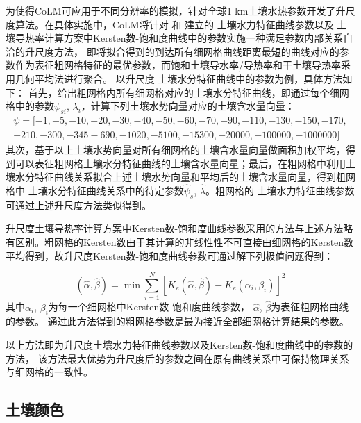 为使得CoLM可应用于不同分辨率的模拟，针对全球1 km土壤水热参数开发了升尺度算法。在具体实施中，CoLM将针对 \citet{campbell1974} 和 \citet{van1980closed} 建立的
土壤水力特征曲线参数以及 \citet{balland2005} 土壤导热率计算方案中Kersten数-饱和度曲线中的参数实施一种满足参数内部关系自洽的升尺度方法，
即将拟合得到的到达所有细网格曲线距离最短的曲线对应的参数作为表征粗网格特征的最优参数，而饱和土壤导水率/导热率和干土壤导热率采用几何平均法进行聚合。
以升尺度 \citet{campbell1974} 土壤水分特征曲线中的参数为例，具体方法如下：
首先，给出粗网格内所有细网格对应的土壤水分特征曲线，即通过每个细网格中的参数$\psi_{s i}$, $\lambda_{i}$，计算下列土壤水势向量对应的土壤含水量向量：
\begin{equation}
\begin{array}{l}\psi=[-1,-5,-10,-20,-30,-40,-50,-60,-70,-90,-110,-130,-150,-170,\\-210,-300,-345  -690,-1020,-5100,-15300,-20000,-100000,-1000000]\end{array}
\end{equation}
其次，基于以上土壤水势向量对所有细网格的土壤含水量向量做面积加权平均，得到可以表征粗网格土壤水分特征曲线的土壤含水量向量；最后，在粗网格中利用\citet{campbell1974}土壤水分特征曲线关系拟合上述土壤水势向量和平均后的土壤含水量向量，得到粗网格中 \citet{campbell1974} 土壤水分特征曲线关系中的待定参数$\hat{\psi}_{s}$, $\hat{\lambda}$。粗网格的\citet{van1980closed} 土壤水力特征曲线参数可通过上述升尺度方法类似得到。


升尺度土壤导热率计算方案中Kersten数-饱和度曲线参数采用的方法与上述方法略有区别。粗网格的Kersten数由于其计算的非线性性不可直接由细网格的Kersten数平均得到，故升尺度Kersten数-饱和度曲线参数可通过解下列极值问题得到：

\begin{equation}
(\hat{\alpha}, \hat{\beta})=\min \sum_{i=1}^{N}\left[K_{e}(\hat{\alpha}, \hat{\beta})-K_{e}\left(\alpha_{i}, \beta_{i}\right)\right]^{2}
\end{equation}
其中$\alpha_{i}$,  $\beta_{i}$为每一个细网格中Kersten数-饱和度曲线参数，
$\hat{\alpha}$, $\hat{\beta}$为表征粗网格曲线的参数。
通过此方法得到的粗网格参数是最为接近全部细网格计算结果的参数。


以上方法即为升尺度土壤水力特征曲线参数以及Kersten数-饱和度曲线中的参数的方法，
该方法最大优势为升尺度后的参数之间在原有曲线关系中可保持物理关系与细网格的一致性。
\subsection{土壤颜色}\label{土壤颜色}

